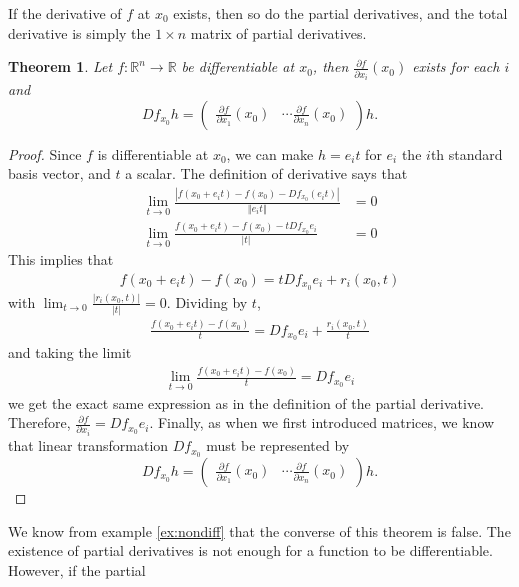 \documentclass[12pt,reqno]{amsart}
\newtheorem{theorem}{Theorem}[section]
\theoremstyle{definition}
\def\R{\mathbb{R}}
\newcommand{\norm}[1]{\left\Vert {#1} \right\Vert}
\renewcommand{\to}{{\rightarrow}}
\begin{document}
If the derivative of $f$ at $x_0$ exists, then so do the partial
derivatives, and the total derivative is simply the $1 \times n$
matrix of partial derivatives.
\begin{theorem}\label{thm:tdiff}
  Let $f: \R^n \to \R$ be differentiable at $x_0$, then
  $\frac{\partial f}{\partial x_i}(x_0)$ exists for each $i$ and 
  \[ Df_{x_0} h = \begin{pmatrix} \frac{ \partial f}{\partial x_1}(x_0) &
    \cdots \frac{ \partial f}{\partial x_n }(x_0)
  \end{pmatrix} h. \]
\end{theorem}
\begin{proof}
  Since $f$ is differentiable at $x_0$, we can make $h = e_i t$ for
  $e_i$ the $i$th standard basis vector, and $t$ a scalar. The
  definition of derivative says that
  \begin{align*}
    \lim_{t \to 0} \frac{\left|f(x_0 + e_i t) - f(x_0) - Df_{x_0} (e_i t)\right|}
    {\norm{e_i t} } & = 0 \\
    \lim_{t \to 0} \frac{f(x_0 + e_i t) - f(x_0) - t D f_{x_0} e_i}
    {|t| } & =  0
  \end{align*}
  This implies that
  \begin{align*}
    f(x_0 + e_i t) - f(x_0) = t D f_{x_0} e_i + r_i(x_0,t)
  \end{align*}
  with $\lim_{t \to 0} \frac{|r_i(x_0,t)|}{|t|} = 0$. Dividing by $t$, 
  \begin{align*}
    \frac{f(x_0 + e_i t) - f(x_0)}{t} = D f_{x_0} e_i + \frac{r_i(x_0,t)}{t}
  \end{align*}
  and taking the limit
  \begin{align*}
    \lim_{t \to 0} \frac{f(x_0 + e_i t) - f(x_0)}{t} = D f_{x_0} e_i 
  \end{align*}
  we get the exact same expression as in the definition of the partial
  derivative. Therefore, $\frac{\partial f}{\partial x_i} = D
  f_{x_0}e_i$. Finally, as when we first introduced matrices, we know
  that linear transformation $D f_{x_0}$ must be represented by
  \[ Df_{x_0} h = \begin{pmatrix} \frac{ \partial f}{\partial x_1}(x_0) &
    \cdots \frac{ \partial f}{\partial x_n }(x_0)
  \end{pmatrix} h. \]
\end{proof}
We know from example \ref{ex:nondiff} that the converse of this
theorem is false. The existence of partial derivatives is not enough
for a function to be differentiable. However, if the partial
\end{document}
